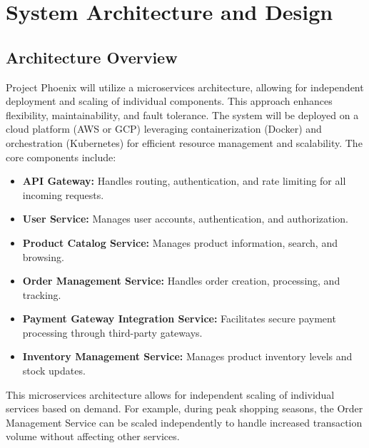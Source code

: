 \documentclass[11pt,a4paper,oneside]{article}
\begin{document}
\section{System Architecture and Design}

\subsection{Architecture Overview}

Project Phoenix will utilize a microservices architecture, allowing for independent deployment and scaling of individual components.  This approach enhances flexibility, maintainability, and fault tolerance. The system will be deployed on a cloud platform (AWS or GCP) leveraging containerization (Docker) and orchestration (Kubernetes) for efficient resource management and scalability.  The core components include:

\begin{itemize}
    \item \textbf{API Gateway:}  Handles routing, authentication, and rate limiting for all incoming requests.
    \item \textbf{User Service:} Manages user accounts, authentication, and authorization.
    \item \textbf{Product Catalog Service:} Manages product information, search, and browsing.
    \item \textbf{Order Management Service:} Handles order creation, processing, and tracking.
    \item \textbf{Payment Gateway Integration Service:}  Facilitates secure payment processing through third-party gateways.
    \item \textbf{Inventory Management Service:} Manages product inventory levels and stock updates.
\end{itemize}

This microservices architecture allows for independent scaling of individual services based on demand. For example, during peak shopping seasons, the Order Management Service can be scaled independently to handle increased transaction volume without affecting other services.
\end{document}
